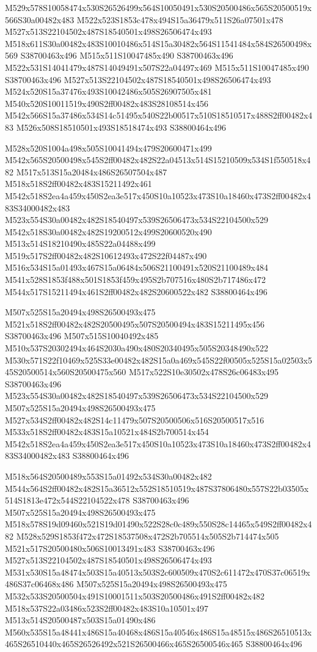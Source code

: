 \documentclass{article}
\begin{document}
\begin{multicols}{2}
M529x578S10058474x530S26526499x564S10050491x530S20500486x565S20500519x566S30a00482x483 M522x523S1853c478x494S15a36479x511S26a07501x478 M527x513S22104502x487S18540501x498S26506474x493 M518x611S30a00482x483S10010486x514S15a30482x564S11541484x584S26500498x569 S38700463x496 M515x511S10047485x490 S38700463x496 M522x531S14041479x487S14049491x507S22a04497x469 M515x511S10047485x490 S38700463x496 M527x513S22104502x487S18540501x498S26506474x493 M524x520S15a37476x493S10042486x505S26907505x481 M540x520S10011519x490S2ff00482x483S28108514x456 M542x566S15a37486x534S14c51495x540S22b00517x510S18510517x488S2ff00482x483 M526x508S18510501x493S18518474x493 S38800464x496

M528x520S1004a498x505S10041494x479S20600471x499 M542x565S20500498x545S2ff00482x482S22a04513x514S15210509x534S1f550518x482 M517x513S15a20484x486S26507504x487 M518x518S2ff00482x483S15211492x461 M542x518S2ea4a459x450S2ea3e517x450S10a10523x473S10a18460x473S2ff00482x483S34000482x483 M523x554S30a00482x482S18540497x539S26506473x534S22104500x529 M542x518S30a00482x482S19200512x499S20600520x490 M513x514S18210490x485S22a04488x499 M519x517S2ff00482x482S10612493x472S22f04487x490 M516x534S15a01493x467S15a06484x506S21100491x520S21100489x484 M541x528S1853f488x501S1853f459x495S2b707516x480S2b717486x472 M544x517S15211494x461S2ff00482x482S20600522x482 S38800464x496

M507x525S15a20494x498S26500493x475 M521x518S2ff00482x482S20500495x507S20500494x483S15211495x456 S38700463x496 M507x515S10040492x485 M510x537S20302494x464S2030a490x480S20340495x505S20348490x522 M530x571S22f10469x525S33e00482x482S15a0a469x545S22f00505x525S15a02503x545S20500514x560S20500475x560 M517x522S10e30502x478S26c06483x495 S38700463x496 M523x554S30a00482x482S18540497x539S26506473x534S22104500x529 M507x525S15a20494x498S26500493x475 M527x534S2ff00482x482S14c11479x507S20500506x516S20500517x516 M533x518S2ff00482x483S15a10521x484S2b700514x454 M542x518S2ea4a459x450S2ea3e517x450S10a10523x473S10a18460x473S2ff00482x483S34000482x483 S38800464x496

M518x564S20500489x553S15a01492x534S30a00482x482 M544x564S2ff00482x482S15a36512x552S18510519x487S37806480x557S22b03505x514S1813e472x544S22104522x478 S38700463x496 M507x525S15a20494x498S26500493x475 M518x578S19d09460x521S19d01490x522S28c0c489x550S28c14465x549S2ff00482x482 M528x529S1853f472x472S18537508x472S2b705514x505S2b714474x505 M521x517S20500480x506S10013491x483 S38700463x496 M527x513S22104502x487S18540501x498S26506474x493 M531x530S15a48474x503S15a40513x503S2c600509x470S2c611472x470S37c06519x486S37c06468x486 M507x525S15a20494x498S26500493x475 M532x533S20500504x491S10001511x503S20500486x491S2ff00482x482 M518x537S22a03486x523S2ff00482x483S10a10501x497 M513x514S20500487x503S15a01490x486 M560x535S15a48441x486S15a40468x486S15a40546x486S15a48515x486S26510513x465S26510440x465S26526492x521S26500466x465S26500546x465 S38800464x496


\end{multicols}
\end{document}
